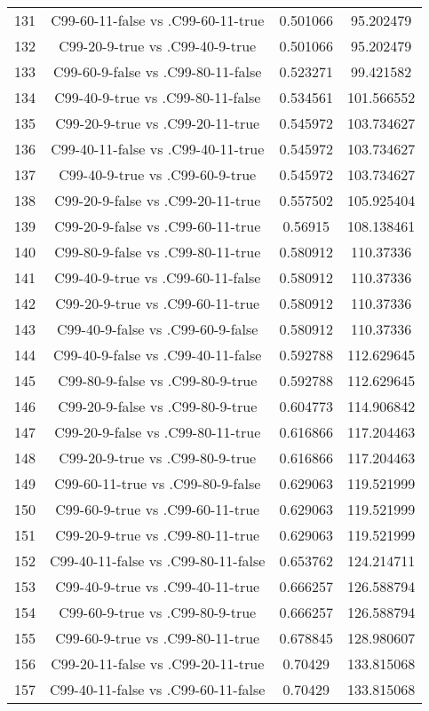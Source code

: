\documentclass[a4paper,10pt]{article}
\begin{document}
\begin{landscape}
\begin{table}[!htp]
\begin{tabular}{cccc}
131&C99-60-11-false vs .C99-60-11-true&0.501066&95.202479\\
132&C99-20-9-true vs .C99-40-9-true&0.501066&95.202479\\
133&C99-60-9-false vs .C99-80-11-false&0.523271&99.421582\\
134&C99-40-9-true vs .C99-80-11-false&0.534561&101.566552\\
135&C99-20-9-true vs .C99-20-11-true&0.545972&103.734627\\
136&C99-40-11-false vs .C99-40-11-true&0.545972&103.734627\\
137&C99-40-9-true vs .C99-60-9-true&0.545972&103.734627\\
138&C99-20-9-false vs .C99-20-11-true&0.557502&105.925404\\
139&C99-20-9-false vs .C99-60-11-true&0.56915&108.138461\\
140&C99-80-9-false vs .C99-80-11-true&0.580912&110.37336\\
141&C99-40-9-true vs .C99-60-11-false&0.580912&110.37336\\
142&C99-20-9-true vs .C99-60-11-true&0.580912&110.37336\\
143&C99-40-9-false vs .C99-60-9-false&0.580912&110.37336\\
144&C99-40-9-false vs .C99-40-11-false&0.592788&112.629645\\
145&C99-80-9-false vs .C99-80-9-true&0.592788&112.629645\\
146&C99-20-9-false vs .C99-80-9-true&0.604773&114.906842\\
147&C99-20-9-false vs .C99-80-11-true&0.616866&117.204463\\
148&C99-20-9-true vs .C99-80-9-true&0.616866&117.204463\\
149&C99-60-11-true vs .C99-80-9-false&0.629063&119.521999\\
150&C99-60-9-true vs .C99-60-11-true&0.629063&119.521999\\
151&C99-20-9-true vs .C99-80-11-true&0.629063&119.521999\\
152&C99-40-11-false vs .C99-80-11-false&0.653762&124.214711\\
153&C99-40-9-true vs .C99-40-11-true&0.666257&126.588794\\
154&C99-60-9-true vs .C99-80-9-true&0.666257&126.588794\\
155&C99-60-9-true vs .C99-80-11-true&0.678845&128.980607\\
156&C99-20-11-false vs .C99-20-11-true&0.70429&133.815068\\
157&C99-40-11-false vs .C99-60-11-false&0.70429&133.815068\\

\end{tabular}
\end{table}
\end{landscape}
\end{document}
